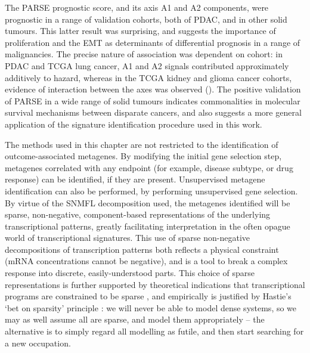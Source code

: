 \documentclass[dissertation.tex]{subfiles}
\begin{document}
The \gls{PARSE} prognostic score, and its axis A1 and A2 components, were prognostic in a range of validation cohorts, both of \gls{PDAC}, and in other solid tumours.  This latter result was surprising, and suggests the importance of proliferation and the \gls{EMT} as determinants of differential prognosis in a range of malignancies.  The precise nature of association was dependent on cohort: in \gls{PDAC} and \gls{TCGA} lung cancer, A1 and A2 signals contributed approximately additively to hazard, whereas in the \gls{TCGA} kidney and glioma cancer cohorts, evidence of interaction between the axes was observed ().  The positive validation of \gls{PARSE} in a wide range of solid tumours indicates commonalities in molecular survival mechanisms between disparate cancers, and also suggests a more general application of the signature identification procedure used in this work.    

The methods used in this chapter are not restricted to the identification of outcome-associated metagenes.  By modifying the initial gene selection step, metagenes correlated with any endpoint (for example, disease subtype, or drug response) can be identified, if they are present.  Unsupervised metagene identification can also be performed, by performing unsupervised gene selection.  By virtue of the \gls{SNMFL} decomposition used, the metagenes identified will be sparse, non-negative, component-based representations of the underlying transcriptional patterns, greatly facilitating interpretation in the often opague world of transcriptional signatures.  This use of sparse non-negative decompositions of transcription patterns both reflects a physical constraint (mRNA concentrations cannot be negative), and is a tool to break a complex response into discrete, easily-understood parts.  This choice of sparse representations is further supported by theoretical indications that transcriptional programs are constrained to be sparse \cite{Leclerc2008}, and empirically is justified by Hastie's `bet on sparsity' principle \cite{Hastie01statisticallearning}: we will never be able to model dense systems, so we may as well assume all are sparse, and model them appropriately -- the alternative is to simply regard all modelling as futile, and then start searching for a new occupation.
\end{document}
